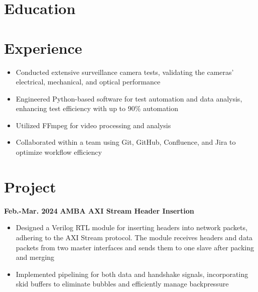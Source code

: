 \documentclass[11pt,a4paper,sans]{moderncv}
\begin{document}
\makecvtitle

\section{Education}

\section{Experience}
{
    \begin{itemize}
    \item Conducted extensive surveillance camera tests, validating the cameras' electrical, mechanical, and optical performance
    \item Engineered Python-based software for test automation and data analysis, enhancing test efficiency with up to 90\% automation
    \item Utilized FFmpeg for video processing and analysis
    \item Collaborated within a team using Git, GitHub, Confluence, and Jira to optimize workflow efficiency
    \end{itemize}
}

\section{Project}

\cventry
{\textnormal{\textbf{Feb.-Mar. 2024}}}
{\textnormal{\textbf{AMBA AXI Stream Header Insertion}}}
{}{}{}
{
    \begin{itemize}
        \item Designed a Verilog RTL module for inserting headers into network packets, adhering to the AXI Stream protocol. The module receives headers and data packets from two master interfaces and sends them to one slave after packing and merging
        \item Implemented pipelining for both data and handshake signals, incorporating skid buffers to eliminate bubbles and efficiently manage backpressure
    \end{itemize}
}
\end{document}
